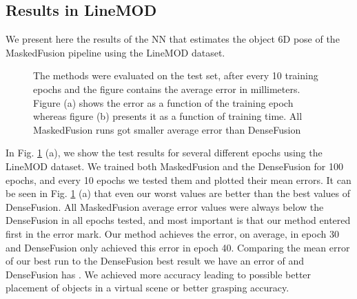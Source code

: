 \documentclass[runningheads]{llncs}
\begin{document}
\subsection{Results in LineMOD}
We present here the results of the NN that estimates the object 6D pose of the MaskedFusion pipeline using the LineMOD dataset.

\begin{figure}[thpb]
\vspace{-2em}
    \centering
    \qquad
    \caption{The methods were evaluated on the test set, after every 10 training epochs and the figure contains the average error in millimeters. Figure (a) shows the error as a function of the training epoch whereas figure (b) presents it as a function of training time. All MaskedFusion runs got smaller average error than DenseFusion}
    \label{fig:plot}
\end{figure}
In Fig. \ref{fig:plot} (a), we show the test results for several different epochs using the LineMOD dataset.
We trained both MaskedFusion and the DenseFusion for 100 epochs, and every 10 epochs we tested them and plotted their mean errors.
It can be seen in Fig. \ref{fig:plot} (a) that even our worst values are better than the best values of DenseFusion.
All MaskedFusion average error values were always below the DenseFusion in all epochs tested, and most important is that our method entered first in the  error mark.
Our method achieves the  error, on average, in epoch 30 and DenseFusion only achieved this error in epoch 40.
Comparing the mean error of our best run to the DenseFusion best result we have an error of  and DenseFusion has .
We achieved more accuracy leading to possible better placement of objects in a virtual scene or better grasping accuracy.
\end{document}

